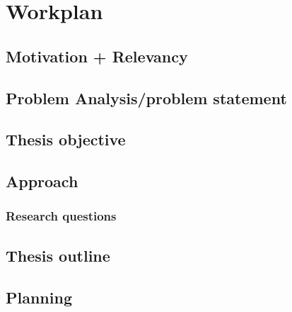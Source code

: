\chapter{Workplan}
\section{Motivation + Relevancy}
\section{Problem Analysis/problem statement}
\section{Thesis objective}
\section{Approach}
\subsection{Research questions}
\section{Thesis outline}
\section{Planning}